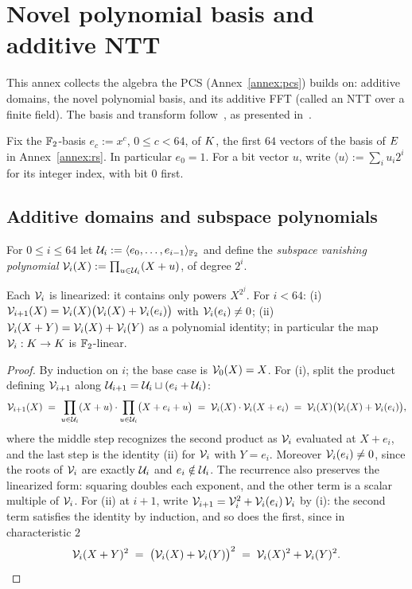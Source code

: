 \section{Novel polynomial basis and additive NTT}\label{app:ntt}

This annex collects the algebra the PCS (Annex~\ref{annex:pcs}) builds on: additive domains, the novel polynomial basis, and its additive FFT (called an NTT over a finite field). The basis and transform follow~\cite{LCH14}, as presented in~\cite{DP24}.

Fix the $\mathbb{F}_2$-basis $e_c:=x^c$, $0\le c<64$, of $K$, the first $64$ vectors of the basis of $E$ in Annex~\ref{annex:rs}. In particular $e_0=1$. For a bit vector $u$, write $\langle u\rangle:=\sum_i u_i2^i$ for its integer index, with bit $0$ first.

\subsection{Additive domains and subspace polynomials}\label{sec:ntt-subspaces}

For $0 \le i \le 64$ let $\mathcal{U}_i := \langle e_0, \dots, e_{i-1} \rangle_{\mathbb{F}_2}$ and define the \emph{subspace vanishing polynomial} $\mathcal{V}_i(X) := \prod_{u \in \mathcal{U}_i}(X + u)$, of degree $2^i$.

\begin{lemma}\label{lem:subspace}
Each $\mathcal{V}_i$ is linearized: it contains only powers $X^{2^j}$. For $i < 64$: (i) $\mathcal{V}_{i+1}(X) = \mathcal{V}_i(X)\bigl(\mathcal{V}_i(X) + \mathcal{V}_i(e_i)\bigr)$ with $\mathcal{V}_i(e_i) \neq 0$; (ii) $\mathcal{V}_i(X + Y) = \mathcal{V}_i(X) + \mathcal{V}_i(Y)$ as a polynomial identity; in particular the map $\mathcal{V}_i : K \to K$ is $\mathbb{F}_2$-linear.
\end{lemma}

\begin{proof}
By induction on $i$; the base case is $\mathcal{V}_0(X) = X$. For (i), split the product defining $\mathcal{V}_{i+1}$ along $\mathcal{U}_{i+1} = \mathcal{U}_i \sqcup (e_i + \mathcal{U}_i)$:
\[
\mathcal{V}_{i+1}(X) \;=\; \prod_{u \in \mathcal{U}_i} (X + u) \cdot \prod_{u \in \mathcal{U}_i} \bigl(X + e_i + u\bigr) \;=\; \mathcal{V}_i(X) \cdot \mathcal{V}_i(X + e_i) \;=\; \mathcal{V}_i(X) \bigl( \mathcal{V}_i(X) + \mathcal{V}_i(e_i) \bigr),
\]
where the middle step recognizes the second product as $\mathcal{V}_i$ evaluated at $X + e_i$, and the last step is the identity (ii) for $\mathcal{V}_i$ with $Y = e_i$. Moreover $\mathcal{V}_i(e_i) \neq 0$, since the roots of $\mathcal{V}_i$ are exactly $\mathcal{U}_i$ and $e_i \notin \mathcal{U}_i$. The recurrence also preserves the linearized form: squaring doubles each exponent, and the other term is a scalar multiple of $\mathcal{V}_i$. For (ii) at $i + 1$, write $\mathcal{V}_{i+1} = \mathcal{V}_i^2 + \mathcal{V}_i(e_i)\, \mathcal{V}_i$ by (i): the second term satisfies the identity by induction, and so does the first, since in characteristic $2$
\[
\mathcal{V}_i(X+Y)^2 \;=\; \bigl(\mathcal{V}_i(X) + \mathcal{V}_i(Y)\bigr)^2 \;=\; \mathcal{V}_i(X)^2 + \mathcal{V}_i(Y)^2 . \qedhere
\]
\end{proof}

